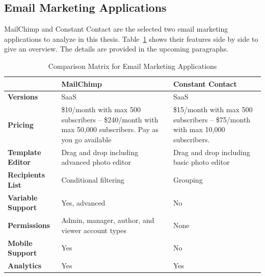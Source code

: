 \clearpage

\subsection{Email Marketing Applications}
\label{subsec:3.3.3:EmaiMarktAppl}

MailChimp and Constant Contact are the selected two email marketing applications to analyze in this thesis. Table~\ref{tab:comp_matr_emai} shows their features side by side to give an overview. The details are provided in the upcoming paragraphs.

\begin{table}[H]
\begin{center}
	\caption[Comparison Matrix for Email Marketing Applications]{Comparison Matrix for Email Marketing Applications} \label{tab:comp_matr_emai}
    \begin{tabular}{ | p{3cm} | p{5cm} | p{5cm} | }
	\hline
	& \textbf{MailChimp} & \textbf{Constant Contact} \\ \hline
	\textbf{Versions} & SaaS & SaaS \\ \hline
	\textbf{Pricing} & \$10/month with max 500 subscribers -- \$240/month with max 50,000 subscribers. Pay as you go available & \$15/month with max 500 subscribers -- \$75/month with max 10,000 subscribers. \\ \hline
	\textbf{Template Editor} & Drag and drop including advanced photo editor & Drag and drop including basic photo editor \\ \hline
	\textbf{Recipients List} & Conditional filtering & Grouping \\ \hline
	\textbf{Variable Support} & Yes, advanced & No \\ \hline
	\textbf{Permissions} & Admin, manager, author, and viewer account types & None \\ \hline
	\textbf{Mobile Support} & Yes & No \\ \hline
	\textbf{Analytics} & Yes & Yes \\ \hline
    \end{tabular}
\end{center}
\end{table}

